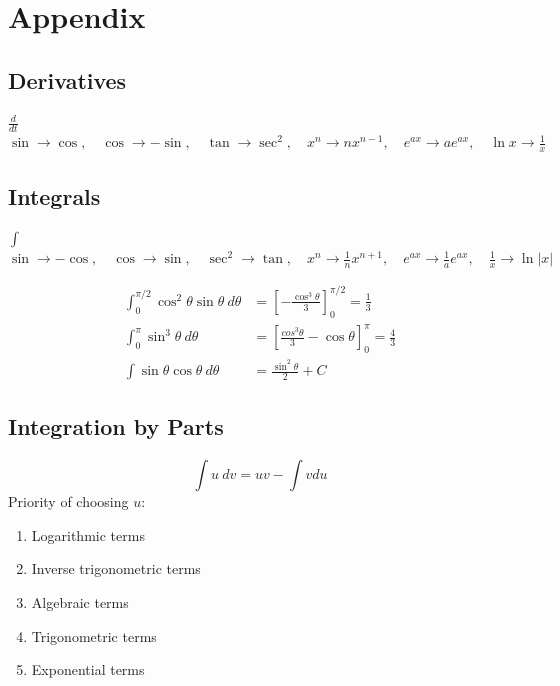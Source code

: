 \documentclass[a4paper]{article}
\begin{document}
\newpage
\appendix
\section{Appendix}
\subsection{Derivatives}
\begin{center}
    $\displaystyle\frac{d}{dt}$\\[0.25cm]
    $\sin\rightarrow\cos,\quad \cos\rightarrow -\sin,\quad \tan\rightarrow\sec^2,\quad x^n\rightarrow nx^{n-1},\quad e^{ax}\rightarrow ae^{ax}, \quad \ln x \rightarrow \displaystyle\frac{1}{x}$
\end{center}
\subsection{Integrals}
\begin{center}
    $\int$\\[0.25cm]
    $\sin\rightarrow -\cos,\quad \cos\rightarrow\sin,\quad \sec^2\rightarrow\tan,\quad x^n\rightarrow\displaystyle\frac{1}{n}x^{n+1},\quad e^{ax}\rightarrow\displaystyle\frac{1}{a}e^{ax},\quad \displaystyle\frac{1}{x}\rightarrow\ln |x|$
\end{center}
\begin{align*}
    \int_0^{\pi/2} \cos^2\theta\sin\theta\ d\theta &= \left[-\frac{\cos^3\theta}{3}\right]_0^{\pi/2} = \frac{1}{3}\\
    \int_0^\pi \sin^3\theta\ d\theta &= \left[\frac{cos^3\theta}{3}-\cos\theta\right]_0^\pi = \frac{4}{3}\\
    \int\sin\theta\cos\theta\ d\theta &= \frac{\sin^2\theta}{2}+C
\end{align*}
\subsection{Integration by Parts}
$$\int u\ dv = uv -\int v du$$
Priority of choosing $u$:
\begin{enumerate}
    \item Logarithmic terms
    \item Inverse trigonometric terms
    \item Algebraic terms
    \item Trigonometric terms
    \item Exponential terms
\end{enumerate}
\end{document}
